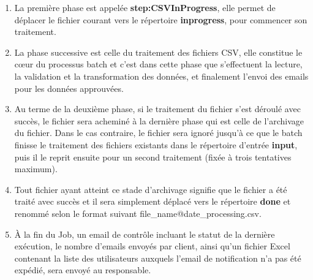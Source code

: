 \begin{enumerate}
    \item La première phase est appelée \textbf{step:CSVInProgress}, elle permet de déplacer le fichier courant vers le répertoire \textbf{inprogress}, pour commencer son traitement.
    \item La phase successive est celle du traitement des fichiers CSV, elle constitue le cœur du processus batch et c'est dans cette phase que s'effectuent la lecture, la validation et la transformation des données, et finalement l'envoi des emails pour les données approuvées.
    \item Au terme de la deuxième phase, si le traitement du fichier s'est déroulé avec succès, le fichier sera acheminé à la dernière phase qui est celle de l'archivage du fichier. Dans le cas contraire, le fichier sera ignoré jusqu'à ce que le batch finisse le traitement des fichiers existants dans le répertoire d'entrée \textbf{input}, puis il le reprit ensuite pour un second traitement (fixée à trois tentatives maximum).\\
    \item Tout fichier ayant atteint ce stade d'archivage signifie que le fichier a été traité avec succès et il sera simplement déplacé vers le répertoire \textbf{done} et renommé selon le format suivant file\_name@date\_processing.csv.
    \item À la fin du Job, un email de contrôle incluant le statut de la dernière exécution, le nombre d'emails envoyés par client, ainsi qu'un fichier Excel contenant la liste des utilisateurs auxquels l'email de notification n'a pas été expédié, sera envoyé au responsable.
\end{enumerate}

